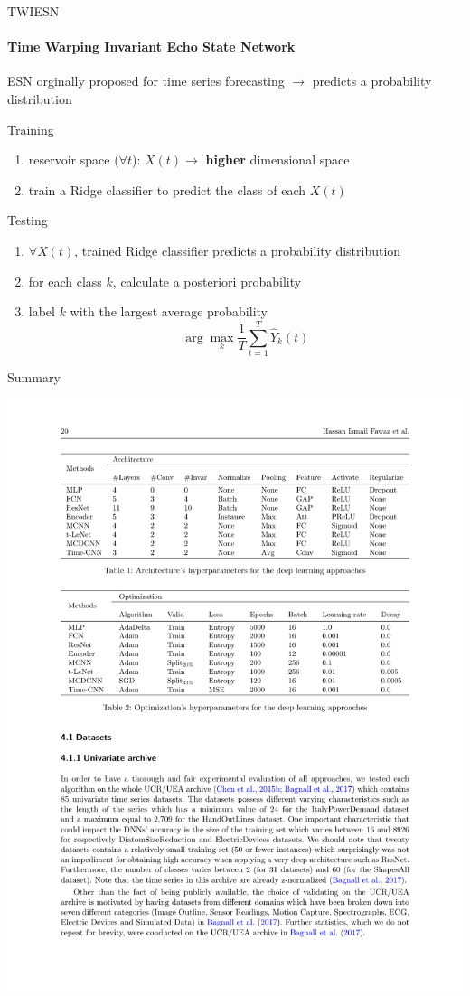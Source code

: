 \documentclass[aspectratio=169]{ctexbeamer}
\begin{document}
\begin{frame}{TWIESN}
	\framesubtitle{Time Warping Invariant Echo State Network}
	ESN orginally proposed for time series forecasting
	$\to$ predicts a probability distribution

	Training
	\begin{enumerate}
		\item reservoir space ($\forall t$): $X(t) \to$ \textbf{higher} dimensional space
		\item train a Ridge classifier to predict the class of each $X(t)$
	\end{enumerate}
	Testing
	\begin{enumerate}
		\item $\forall X(t)$, trained Ridge classifier predicts a probability distribution
		\item for each class $k$, calculate a posteriori probability
		\item label $k$ with the largest average probability
		$$\arg\max_{k}{\frac{1}{T}} \sum_{t=1}^{T} {\hat Y_k (t)}$$
	\end{enumerate}
\end{frame}

\begin{frame}{Summary}
	\begin{center}
		\includegraphics[width=1.05\textwidth]{figure/arch}
	\end{center}
\end{frame}
\end{document}
